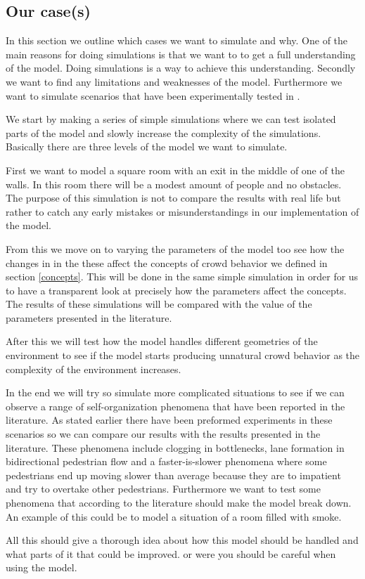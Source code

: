\subsection{Our case(s)}
In this section we outline which cases we want to simulate and why.
One of the main reasons for doing simulations is that we want to to get 
a full understanding of the model. Doing simulations is a way to achieve this
understanding. Secondly we want to find any limitations and weaknesses of the 
model. Furthermore we want to simulate scenarios that have been experimentally 
tested in \citep{self-org}.

We start by making a series of simple simulations  where we can test isolated parts 
of the model and slowly increase the complexity of the simulations. Basically there 
are three levels of the model we want to simulate. 

First we want to model a square room with an exit in the middle of one of the walls. 
In this room there will be a modest amount of people and no obstacles. The purpose of 
this simulation is not to compare the results with real life but rather to catch any 
early mistakes or misunderstandings in our implementation of the model.

From this we move on to varying the parameters of the model too see how the changes in 
in the these affect the concepts of crowd behavior we defined in section \ref{concepts}. 
This will be done in the same simple simulation in order for us to have a transparent look 
at precisely how the parameters affect the concepts. The results of these simulations 
will be compared with the value of the parameters presented in the literature.

After this we will test how the model handles different geometries of the environment 
to see if the model starts producing unnatural crowd behavior as the complexity of the 
environment increases. 

In the end we will try so simulate more complicated situations to see if we can observe 
a range of self-organization phenomena that have been reported in the literature. As 
stated earlier there have been preformed experiments in these scenarios so we can 
compare our results with the results presented in the literature. These phenomena 
include clogging in bottlenecks, lane formation in bidirectional pedestrian 
flow and a faster-is-slower phenomena where some pedestrians end up moving slower than 
average because they are to impatient and try to overtake other pedestrians\cite{self-org}. 
Furthermore we want to test some phenomena  that according to the literature should make 
the model break down. An example of this could be to model a situation of a room filled 
with smoke.   

All this should give a thorough idea about how this model should be handled and what parts 
of it that could be improved. or were you should be careful when using the model.